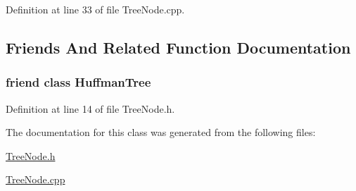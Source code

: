Definition at line 33 of file Tree\+Node.\+cpp.



\subsection{Friends And Related Function Documentation}
\subsubsection[{\texorpdfstring{Huffman\+Tree}{HuffmanTree}}]{\setlength{\rightskip}{0pt plus 5cm}friend class {\bf Huffman\+Tree}\hspace{0.3cm}{\ttfamily [friend]}}\hypertarget{classhuffman_1_1TreeNode_a062a9593db748950f1e31d49fd2cae41}{}\label{classhuffman_1_1TreeNode_a062a9593db748950f1e31d49fd2cae41}


Definition at line 14 of file Tree\+Node.\+h.



The documentation for this class was generated from the following files\+:\begin{DoxyCompactItemize}
\item 
\hyperlink{TreeNode_8h}{Tree\+Node.\+h}\item 
\hyperlink{TreeNode_8cpp}{Tree\+Node.\+cpp}\end{DoxyCompactItemize}
